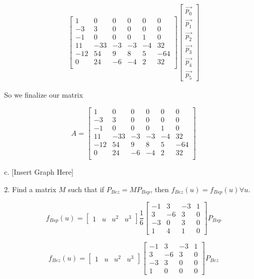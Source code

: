 \documentclass{letter}
\begin{document}
\begin{align*}
\begin{bmatrix}
1 & 0 & 0 & 0 & 0 & 0 \\
-3 & 3 & 0 & 0 & 0 & 0 \\
-1 & 0 & 0 & 0 & 1 & 0 \\
11 & -33 & -3 & -3 & -4 & 32 \\
-12 & 54 & 9 & 8 & 5 & -64 \\
0 & 24 & -6 & -4 & 2 & 32 \\
\end{bmatrix}
\begin{bmatrix}
\vec{p_0} \\
\vec{p_1} \\
\vec{p_2} \\
\vec{p_3} \\
\vec{p_4} \\
\vec{p_5} 
\end{bmatrix}
\end{align*}

So we finalize our matrix

$$A = 
\begin{bmatrix}
1 & 0 & 0 & 0 & 0 & 0 \\
-3 & 3 & 0 & 0 & 0 & 0 \\
-1 & 0 & 0 & 0 & 1 & 0 \\
11 & -33 & -3 & -3 & -4 & 32 \\
-12 & 54 & 9 & 8 & 5 & -64 \\
0 & 24 & -6 & -4 & 2 & 32 \\
\end{bmatrix}
$$

c. [Insert Graph Here]

2. Find a matrix $M$ such that if $P_{Bez} = MP_{Bsp}$, then $f_{Bez}(u) = f_{Bsp}(u) \forall u$. 

$$f_{Bsp}(u) = 
\begin{bmatrix}
1 &
u &
u^2 &
u^3
\end{bmatrix}
\frac{1}{6}
\begin{bmatrix}
-1 & 3 & -3 & 1 \\
3 & -6 & 3 & 0 \\
-3 & 0 & 3 & 0 \\
1 & 4 & 1 & 0 
\end{bmatrix}
P_{Bsp}
$$

$$f_{Bez}(u) = 
\begin{bmatrix}
1 &
u &
u^2 &
u^3
\end{bmatrix}
\begin{bmatrix}
-1 & 3 & -3 & 1 \\
3 & -6 & 3 & 0 \\
-3 & 3 & 0 & 0 \\
1 & 0 & 0 & 0 
\end{bmatrix}
P_{Bez}
$$
\end{document}
